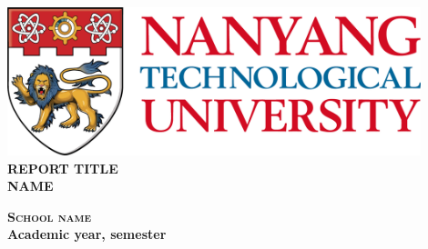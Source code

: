 \begin{titlepage}
\begin{center}

\includegraphics[width=0.9\textwidth]{images/ntu_logo.png}
\\[5cm]

\uppercase{\textbf{Report title}}
\\[5cm]

\uppercase{
\textbf{
Name
}}

\vfill

\textsc{\bfseries School name}
\\
\textbf{Academic year, semester}

\end{center}
\end{titlepage}

